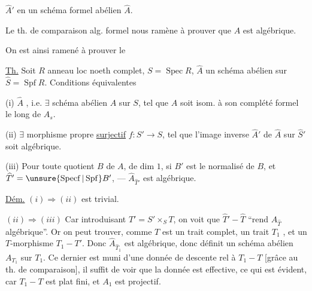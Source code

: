 $\widehat A'$ en un schéma formel abélien $\widehat A$.

Le th. de comparaison alg. formel nous ramène à prouver que $A$ est algébrique.

On est ainsi ramené à prouver le

\uline{Th.} Soit $R$ anneau loc noeth complet, $S=\operatorname{Spec}R$, $\widehat A$ un schéma  abélien sur $\widehat S=\operatorname{Spf}R$. Conditions équivalentes

(i) $\widehat A$ , i.e. $\exists$ schéma abélien $A$ sur $S$, tel que $\widehat A$ soit isom. à son complété formel le long de $A_s$.

(ii) $\exists$ morphisme propre \uline{surjectif}  $f:S'\longrightarrow S$,  tel que l'image inverse $\widehat A'$ de $\widehat A$ sur $\widehat S'$ soit algébrique.

(iii) Pour toute  quotient   $B$ de $A$, de dim $1$, si $B'$ est le normalisé de $B$, et  $\widehat T'=\unsure{\operatorname{Specf}|\operatorname{Spf}}B'$, --- $\widehat A_{\widehat T'}$ est algébrique.



\uline{Dém.} $(i)\Longrightarrow(ii)$ est trivial.

$(ii)\Longrightarrow(iii)$ Car introduisant $T'=S'\times_S T$, on voit que $\widehat T'\mathbin{-}\widehat T$ ``rend $\widehat A_{\widehat T}$ algébrique''. Or on peut trouver, comme $T$ est un trait complet, un trait $T_1$  , et un $T$-morphisme $T_1\mathbin{-}T'$. Donc $\widehat A_{\widehat T_1}$ est algébrique, donc définit un schéma abélien $A_{T_1}$ sur $T_1$. Ce dernier est muni d'une donnée de descente rel à $T_1\mathbin{-}T$ [grâce au th. de comparaison], il suffit  de voir que la donnée est effective, ce qui est évident, car $T_1\mathbin{-}T$ est  plat fini, et $A_1$ est projectif.


